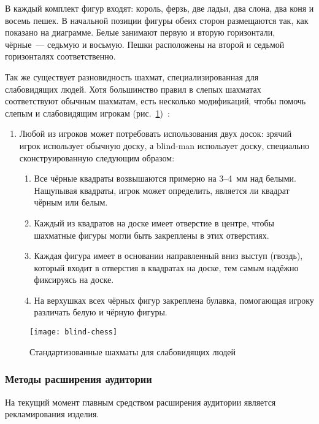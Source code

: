 В каждый комплект фигур входят: король, ферзь, две ладьи, два слона, два коня и
восемь пешек. В начальной позиции фигуры обеих сторон размещаются так, как
показано на диаграмме. Белые занимают первую и вторую горизонтали, чёрные —
седьмую и восьмую. Пешки расположены на второй и седьмой горизонталях
соответственно. 

Так же существует разновидность шахмат, специализированная для слабовидящих
людей. Хотя большинство правил в слепых шахматах соответствуют обычным
шахматам, есть несколько модификаций, чтобы помочь слепым и слабовидящим
игрокам (рис.~\ref{fig:blind-chess})~\cite{web:wiki-ibca}:
\begin{enumerate}
    \item Любой из игроков может потребовать использования двух досок: зрячий
        игрок использует обычную доску, а \gls{blind-man} использует доску,
        специально сконструированную следующим образом: 
        \begin{enumerate}
            \item Все чёрные квадраты возвышаются примерно на 3--4 мм над
                белыми. Нащупывая квадраты, игрок может определить, является ли
                квадрат чёрным или белым.
            \item Каждый из квадратов на доске имеет отверстие в центре, чтобы
                шахматные фигуры могли быть закреплены в этих отверстиях.
            \item Каждая фигура имеет в основании направленный вниз выступ
                (гвоздь), который входит в отверстия в квадратах на доске, тем
                самым надёжно фиксируясь на доске.
            \item На верхушках всех чёрных фигур закреплена булавка, помогающая
                игроку различать белую и чёрную фигуры.
        \end{enumerate}
\end{enumerate}
\begin{figure}[H]
    \centering
    \texttt{[image: blind-chess]}
    \caption{Стандартизованные шахматы для слабовидящих людей}\label{fig:blind-chess}
\end{figure}

\subsubsection{Методы расширения аудитории}
На текущий момент главным средством расширения аудитории является
рекламирования изделия.

